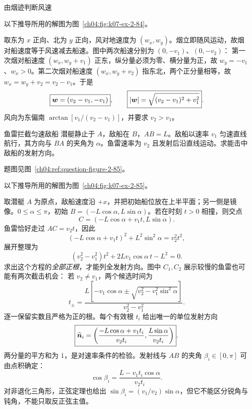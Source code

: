 {\begin{origexamplebox}{由烟迹判断风速}
\begin{qualityfigure}
\label{mech:04:84:q}
\end{qualityfigure}
\end{origexamplebox}
\begin{xesolution}
以下推导所用的解图为图~\ref{ch04:fig:k07-ex-2-84}。

取东为 $x$ 正向、北为 $y$ 正向，风对地速度为 $(w_x,w_y)$。烟立即随风运动，故烟对船速度等于风速减去船速。图中两次船速分别为 $(0,-v_1)$、$(0,-v_2)$：
\SmokeWindDiagram
第一次烟对船速度 $(w_x,w_y+v_1)$ 正东，纵分量必须为零、横分量为正，故 $w_y=-v_1$、$w_x>0$。第二次烟对船速度 $(w_x,w_y+v_2)$ 指东北，两个正分量相等，故 $w_x=w_y+v_2=v_2-v_1$。于是
\[
\boxed{\bm{w}=(v_2-v_1,-v_1)},\qquad
\boxed{|\bm{w}|=\sqrt{(v_2-v_1)^2+v_1^2}}.
\]
风向为东偏南 $\arctan[v_1/(v_2-v_1)]$，并要求 $v_2>v_1$。
\end{xesolution}

\begin{origexamplebox}{鱼雷拦截匀速敌船}\label{ch04:ex:k07-2-85}
潜艇静止于 $A$，敌船在 $B$，$AB=L$。敌船以速率 $v_1$ 匀速直线航行，其方向与 $BA$ 的夹角为 $\alpha$。鱼雷速率为 $v_2$ 且发射后沿直线运动。求能击中敌船的发射方向。
\par 题图见图~\ref{ch04:ref:question-figure-2-85}。
\KQuestionDH
\end{origexamplebox}
\begin{xesolution}
以下推导所用的解图为图~\ref{ch04:fig:k07-ex-2-85}。

取潜艇 $A$ 为原点，敌船速度沿 $+x$，并把初始船位放在上半平面；另一侧是镜像。$0\le\alpha\le\pi$，初始 $B=(-L\cos\alpha,L\sin\alpha)$。若在时刻 $t>0$ 相撞，则交点
\[
C=(-L\cos\alpha+v_1t,L\sin\alpha).
\]
鱼雷恰好走过 $AC=v_2t$，因此
\[
(-L\cos\alpha+v_1t)^2+L^2\sin^2\alpha=v_2^2t^2,
\]
展开整理为
\[
\boxed{(v_2^2-v_1^2)t^2+2Lv_1\cos\alpha\,t-L^2=0}.
\]
求出这个方程的\emph{全部正根}，才能列全发射方向。图中 $C_1,C_2$ 展示较慢的鱼雷也可能有两次截击机会：
\InterceptTriangleDiagram
若 $v_2\ne v_1$，两个候选时间为
\[
t_{\pm}=\frac{L[-v_1\cos\alpha\pm\sqrt{v_2^2-v_1^2\sin^2\alpha}]}{v_2^2-v_1^2}.
\]
逐一保留实数且严格为正的根。每个有效根 $t_i$ 给出唯一的单位发射方向
\[
\boxed{\widehat{\bm{n}}_i=
\left(\frac{-L\cos\alpha+v_1t_i}{v_2t_i},
\frac{L\sin\alpha}{v_2t_i}\right)}.
\]
两分量的平方和为 $1$，是对速率条件的检验。发射线与 $AB$ 的夹角 $\beta_i\in[0,\pi]$ 可由点积确定：
\[
\cos\beta_i=\frac{L-v_1t_i\cos\alpha}{v_2t_i}.
\]
对非退化三角形，正弦定理也给出 $\sin\beta_i=(v_1/v_2)\sin\alpha$，但它不能区分锐角与钝角，不能只取反正弦主值。


\end{xesolution}}
